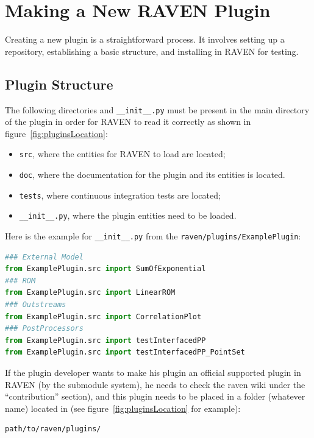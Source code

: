 \section{Making a New RAVEN Plugin}

Creating a new plugin is a straightforward process. It involves setting up a repository,
establishing a basic structure, and installing in RAVEN for testing.


\subsection{Plugin Structure}
The following directories and \texttt{\_\_init\_\_.py} must be present in the main directory of the plugin in order for RAVEN to
read it correctly as shown in figure~\ref{fig:pluginsLocation}:
\begin{itemize}
  \item \texttt{src}, where the entities for RAVEN to load are located;
  \item \texttt{doc}, where the documentation for the plugin and its entities is located.
  \item \texttt{tests}, where continuous integration tests are located;
  \item \texttt{\_\_init\_\_.py}, where the plugin entities need to be loaded.
\end{itemize}

Here is the example for \texttt{\_\_init\_\_.py} from the \texttt{raven/plugins/ExamplePlugin}:
\begin{lstlisting}[language=python, breaklines=True, columns=fullflexible]
### External Model
from ExamplePlugin.src import SumOfExponential
### ROM
from ExamplePlugin.src import LinearROM
### Outstreams
from ExamplePlugin.src import CorrelationPlot
### PostProcessors
from ExamplePlugin.src import testInterfacedPP
from ExamplePlugin.src import testInterfacedPP_PointSet
\end{lstlisting}

If the plugin developer wants to make his plugin
an official supported plugin in RAVEN (by the submodule system), he needs to check
the raven wiki under the ``contribution'' section), and this plugin needs to be placed in a folder (whatever name) located
in (see figure~\ref{fig:pluginsLocation} for example):
\begin{lstlisting}[language=bash]
 path/to/raven/plugins/
\end{lstlisting}

